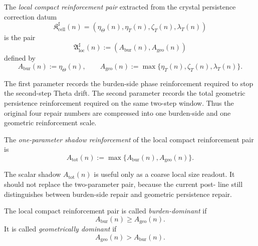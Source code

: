 \begin{definition}
\label{def:local-compact-reinforcement-pair}
The \emph{local compact reinforcement pair} extracted from the crystal persistence correction datum
\[
 \mathfrak K_{\mathrm{cell}}^{\sharp}(n)
 =
 (\eta_{\Theta}(n),\eta_T(n),\zeta_T(n),\lambda_T(n))
\]
is the pair
\[
 \mathfrak A_{\mathrm{loc}}^{\sharp}(n)
 :=
 (A_{\mathrm{bur}}(n),A_{\mathrm{geo}}(n))
\]
defined by
\[
 A_{\mathrm{bur}}(n):=\eta_{\Theta}(n),
 \qquad
 A_{\mathrm{geo}}(n):=\max\{\eta_T(n),\zeta_T(n),\lambda_T(n)\}.
\]
\end{definition}

\begin{remark}
\label{rem:meaning-of-the-compact-pair}
The first parameter records the burden-side phase reinforcement required to stop the second-step Theta drift.
The second parameter records the total geometric persistence reinforcement required on the same two-step window.
Thus the original four repair numbers are compressed into one burden-side and one geometric reinforcement scale.
\end{remark}

\begin{definition}
\label{def:one-parameter-shadow-reinforcement}
The \emph{one-parameter shadow reinforcement} of the local compact reinforcement pair is
\[
 A_{\mathrm{tot}}(n)
 :=
 \max\{A_{\mathrm{bur}}(n),A_{\mathrm{geo}}(n)\}.
\]
\end{definition}

\begin{remark}
\label{rem:why-the-one-parameter-shadow-is-secondary}
The scalar shadow $A_{\mathrm{tot}}(n)$ is useful only as a coarse local size readout.
It should not replace the two-parameter pair, because the current post- line still distinguishes between burden-side repair and geometric persistence repair.
\end{remark}

\begin{definition}
\label{def:burden-dominant-compact-reinforcement}
The local compact reinforcement pair is called \emph{burden-dominant} if
\[
 A_{\mathrm{bur}}(n)\ge A_{\mathrm{geo}}(n).
\]
It is called \emph{geometrically dominant} if
\[
 A_{\mathrm{geo}}(n)>A_{\mathrm{bur}}(n).
\]
\end{definition}

